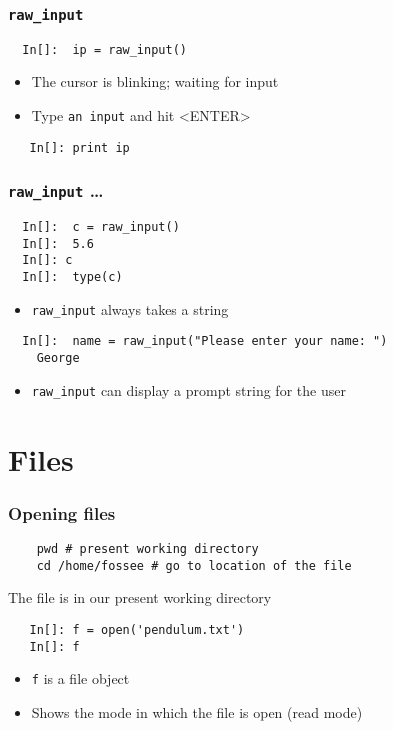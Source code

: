 \begin{frame}[fragile]
  \frametitle{\texttt{raw\_input}}
  \begin{lstlisting}
  In[]:  ip = raw_input()    
  \end{lstlisting}
  \begin{itemize}
  \item The cursor is blinking; waiting for input
  \item Type \texttt{an input} and hit <ENTER>
  \end{itemize}
  \begin{lstlisting}
   In[]: print ip
  \end{lstlisting}
\end{frame}

\begin{frame}[fragile]
  \frametitle{\texttt{raw\_input} \ldots}
  \begin{lstlisting}
  In[]:  c = raw_input()
  In[]:  5.6
  In[]: c
  In[]:  type(c)
  \end{lstlisting}
  \begin{itemize}
  \item \alert{\texttt{raw\_input} always takes a string}
  \end{itemize}
  \begin{lstlisting}
  In[]:  name = raw_input("Please enter your name: ")
    George
  \end{lstlisting}
  \begin{itemize}
  \item \texttt{raw\_input} can display a prompt string for the user
  \end{itemize}
\end{frame}

\section{Files}

\begin{frame}[fragile]
  \frametitle{Opening files}
  \begin{lstlisting}
    pwd # present working directory
    cd /home/fossee # go to location of the file
  \end{lstlisting}
  {\tiny The file is in our present working directory}
  \begin{lstlisting}
   In[]: f = open('pendulum.txt')
   In[]: f
  \end{lstlisting}
  \begin{itemize}
  \item \texttt{f} is a file object
  \item Shows the mode in which the file is open (read mode)
  \end{itemize}
\end{frame}


